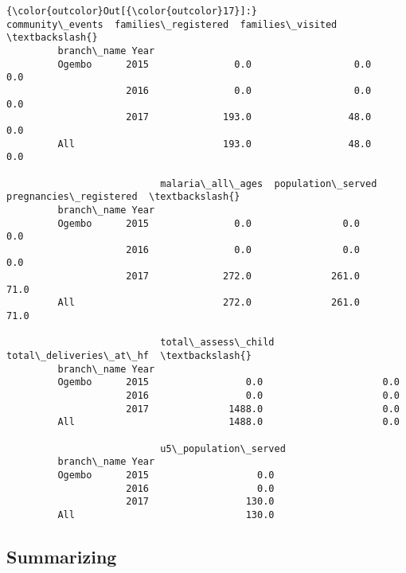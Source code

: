 \documentclass[11pt]{article}
\begin{document}
\begin{Verbatim}[commandchars=\\\{\}]
{\color{outcolor}Out[{\color{outcolor}17}]:}                   community\_events  families\_registered  families\_visited  \textbackslash{}
         branch\_name Year                                                            
         Ogembo      2015               0.0                  0.0               0.0   
                     2016               0.0                  0.0               0.0   
                     2017             193.0                 48.0               0.0   
         All                          193.0                 48.0               0.0   
         
                           malaria\_all\_ages  population\_served  pregnancies\_registered  \textbackslash{}
         branch\_name Year                                                                
         Ogembo      2015               0.0                0.0                     0.0   
                     2016               0.0                0.0                     0.0   
                     2017             272.0              261.0                    71.0   
         All                          272.0              261.0                    71.0   
         
                           total\_assess\_child  total\_deliveries\_at\_hf  \textbackslash{}
         branch\_name Year                                               
         Ogembo      2015                 0.0                     0.0   
                     2016                 0.0                     0.0   
                     2017              1488.0                     0.0   
         All                           1488.0                     0.0   
         
                           u5\_population\_served  
         branch\_name Year                        
         Ogembo      2015                   0.0  
                     2016                   0.0  
                     2017                 130.0  
         All                              130.0  
\end{Verbatim}
            
    \subsection{Summarizing}\label{summarizing}
\end{document}
